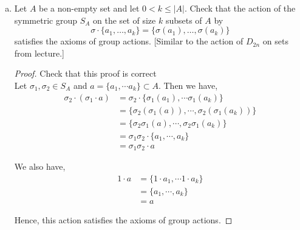 \documentclass[11pt, reqno]{amsart}
\theoremstyle{plain}
\theoremstyle{definition}
\theoremstyle{example}
\newcommand{\NOTE}[1]{{\color{red}#1}}
\begin{document}
\begin{enumerate}[1.]
\begin{enumerate}[(a)]
\begin{proof}
Hence, we have that $gRg^{-1} = S$, and so our map is surjective and hence bijective.\\

Now consider again sets $S, R \in \mathcal{P}(G) \setminus \emptyset$. Then we have
\begin{align*}
gSRg^{-1} &= gS(g^{-1}g)Rg^{-1}\\
&= (gSg^{-1})(gRg^{-1})
\end{align*}

So the map is homomorphism and hence and isomorphishm. Thus, again from problem 2b(iii) on Homework 2, we can assert that 
\begin{align*}
|S| = |gSg^{-1}|
\end{align*}

for every $S \in \mathcal{P}(G) \setminus \emptyset$

\end{proof}
\newpage
\item \label{subsets} 
Let $A$ be a non-empty set and let $0<k \leq |A|$. Check that the action of the  symmetric group $S_A$  on the set of size $k$ subsets of $A$ by 
$$\sigma\cdot \{a_1, \dots, a_k\} = \{\sigma(a_1), \dots, \sigma(a_k)\}$$
satisfies the axioms of group actions. \hfill {\small[Similar to the action of $D_{2n}$ on sets from lecture.]}

\begin{proof} \NOTE{Check that this proof is correct}\\
Let $\sigma_1, \sigma_2 \in S_A$ and $a = \{a_1, \cdots a_k\} \subset A$. Then we have,
\begin{align*}
\sigma_2 \cdot (\sigma_1 \cdot a) &= \sigma_2 \cdot \{\sigma_1(a_1), \cdots \sigma_1(a_k)\}\\
&= \{\sigma_2(\sigma_1(a)), \cdots, \sigma_2(\sigma_1(a_k))\}\\
&= \{\sigma_2\sigma_1(a), \cdots, \sigma_2\sigma_1(a_k)\}\\
&= \sigma_1 \sigma_2 \cdot \{a_1, \cdots, a_k\}\\
&= \sigma_1 \sigma_2 \cdot a
\end{align*}

We also have,
\begin{align*}
1 \cdot a &= \{1 \cdot a_1, \cdots 1 \cdot a_k\}\\
&= \{a_1, \cdots, a_k\}\\
&= a
\end{align*}

Hence, this action satisfies the axioms of group actions.
\end{proof}


\end{enumerate}
\end{enumerate}
\end{document}
